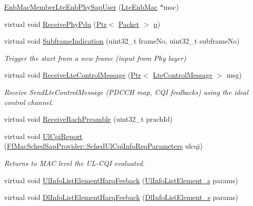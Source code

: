 \begin{DoxyCompactItemize}
\item 
\hyperlink{classns3_1_1EnbMacMemberLteEnbPhySapUser_aa100c13f9b0cd98eca8bb1b783674b3d}{Enb\+Mac\+Member\+Lte\+Enb\+Phy\+Sap\+User} (\hyperlink{classns3_1_1LteEnbMac}{Lte\+Enb\+Mac} $\ast$mac)
\item 
virtual void \hyperlink{classns3_1_1EnbMacMemberLteEnbPhySapUser_a3c343176b9752985d03f18967c8b8490}{Receive\+Phy\+Pdu} (\hyperlink{classns3_1_1Ptr}{Ptr}$<$ \hyperlink{classns3_1_1Packet}{Packet} $>$ \hyperlink{lte__link__budget__x2__handover__measures_8m_ac9de518908a968428863f829398a4e62}{p})
\item 
virtual void \hyperlink{classns3_1_1EnbMacMemberLteEnbPhySapUser_adf6241549d4864e9ffd90930d9ab0989}{Subframe\+Indication} (uint32\+\_\+t frame\+No, uint32\+\_\+t subframe\+No)
\begin{DoxyCompactList}\small\item\em Trigger the start from a new frame (input from Phy layer) \end{DoxyCompactList}\item 
virtual void \hyperlink{classns3_1_1EnbMacMemberLteEnbPhySapUser_a57873c0cd889aabc04425bffc8d24a1c}{Receive\+Lte\+Control\+Message} (\hyperlink{classns3_1_1Ptr}{Ptr}$<$ \hyperlink{classns3_1_1LteControlMessage}{Lte\+Control\+Message} $>$ msg)
\begin{DoxyCompactList}\small\item\em Receive Send\+Lte\+Control\+Message (P\+D\+C\+CH map, C\+QI feedbacks) using the ideal control channel. \end{DoxyCompactList}\item 
virtual void \hyperlink{classns3_1_1EnbMacMemberLteEnbPhySapUser_a1ca77eb3b983e3b6b109fd58662c92c5}{Receive\+Rach\+Preamble} (uint32\+\_\+t prach\+Id)
\item 
virtual void \hyperlink{classns3_1_1EnbMacMemberLteEnbPhySapUser_a72747ee1cbadc6f4704114ad00c29502}{Ul\+Cqi\+Report} (\hyperlink{structns3_1_1FfMacSchedSapProvider_1_1SchedUlCqiInfoReqParameters}{Ff\+Mac\+Sched\+Sap\+Provider\+::\+Sched\+Ul\+Cqi\+Info\+Req\+Parameters} ulcqi)
\begin{DoxyCompactList}\small\item\em Returns to M\+AC level the U\+L-\/\+C\+QI evaluated. \end{DoxyCompactList}\item 
virtual void \hyperlink{classns3_1_1EnbMacMemberLteEnbPhySapUser_a82b83a14c5efebfea8adc9d82ab2c728}{Ul\+Info\+List\+Element\+Harq\+Feeback} (\hyperlink{structns3_1_1UlInfoListElement__s}{Ul\+Info\+List\+Element\+\_\+s} params)
\item 
virtual void \hyperlink{classns3_1_1EnbMacMemberLteEnbPhySapUser_aaa91842457737987e05d8458da0deff1}{Dl\+Info\+List\+Element\+Harq\+Feeback} (\hyperlink{structns3_1_1DlInfoListElement__s}{Dl\+Info\+List\+Element\+\_\+s} params)
\end{DoxyCompactItemize}

